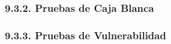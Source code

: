 

\subsubsection{9.3.2. Pruebas de Caja Blanca}\label{sec:cap9_caja_blanca}



\subsubsection{9.3.3. Pruebas de Vulnerabilidad}\label{sec:cap9_vulnerabilidad}

